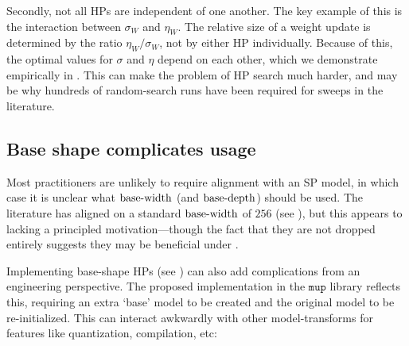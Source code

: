 Secondly, not all HPs are independent of one another. The key example of this is the interaction between $\sigma_W$ and $\eta_W$. The relative size of a weight update is determined by the ratio $\eta_W / \sigma_W$, not by either HP individually. Because of this, the optimal values for $\sigma$ and $\eta$ depend on each other, which we demonstrate empirically in . This can make the problem of HP search much harder, and may be why hundreds of random-search runs have been required for sweeps in the literature.


\subsection{Base shape complicates usage}

Most practitioners are unlikely to require alignment with an SP model, in which case it is unclear what $\mathrm{base{\text -}width}$ (and $\mathrm{base{\text -}depth}$) should be used. The literature has aligned on a standard $\mathrm{base{\text -}width}$ of $256$ (see ), but this appears to lacking a principled motivation---though the fact that they are not dropped entirely suggests they may be beneficial under \umup.

Implementing base-shape HPs (see ) can also add complications from an engineering perspective. The proposed implementation in the $\texttt{mup}$ library \citep{Mup_Library} reflects this, requiring an extra `base' model to be created and the original model to be re-initialized. This can interact awkwardly with other model-transforms for features like quantization, compilation, etc:

\vspace{0.3em}


